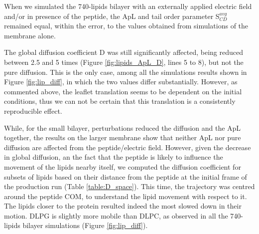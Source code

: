 When we simulated the 740-lipids bilayer with an externally applied electric field and/or in presence of the peptide, the ApL and tail order parameter S$^{avg}_{CD}$ remained equal, within the error, to the values obtained from simulations of the membrane alone.

The global diffusion coefficient D was still significantly affected, being reduced between 2.5 and 5 times (Figure \ref{fig:lipids_ApL_D}, lines 5 to 8), but not the pure diffusion. This is the only case, among all the simulations results shown in Figure \ref{fig:lip_diff}, in which the two values differ substantially. However, as commented above, the leaflet translation seems to be dependent on the initial conditions, thus we can not be certain that this translation is a consistently reproducible effect.

While, for the small bilayer, perturbations reduced the diffusion and the ApL together, the results on the larger membrane show that neither ApL nor pure diffusion are affected from the peptide/electric field.
%
However, given the decrease in global diffusion, an the fact that the peptide is likely to influence the movement of the lipids nearby itself, we computed the diffusion coefficient for subsets of lipids based on their distance from the peptide at the initial frame of the production run (Table \ref{table:D_space}). This time, the trajectory was centred around the peptide COM, to understand the lipid movement with respect to it. The lipids closer to the protein resulted indeed the most slowed down in their motion. DLPG is slightly more mobile than DLPC, as observed in all the 740-lipids bilayer simulations (Figure \ref{fig:lip_diff}).

